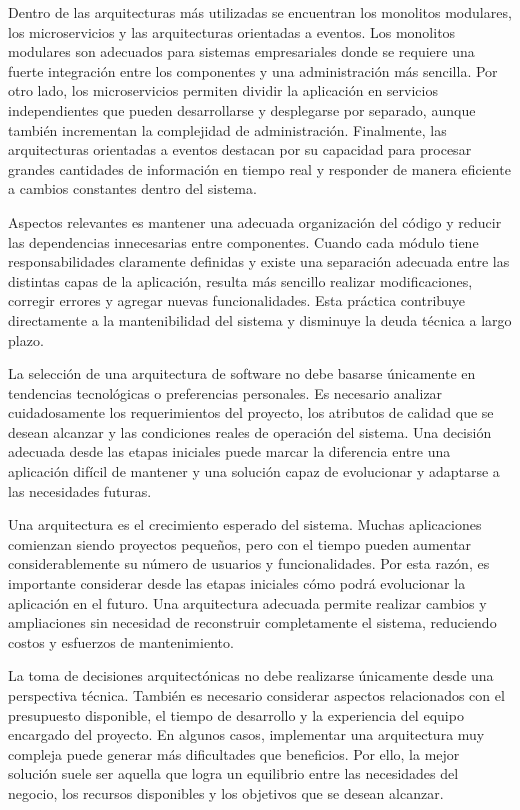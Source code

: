 \documentclass[12pt,letterpaper]{article}
\begin{document}
Dentro de las arquitecturas más utilizadas se encuentran los monolitos modulares, los microservicios y las arquitecturas orientadas a eventos. Los monolitos modulares son adecuados para sistemas empresariales donde se requiere una fuerte integración entre los componentes y una administración más sencilla. Por otro lado, los microservicios permiten dividir la aplicación en servicios independientes que pueden desarrollarse y desplegarse por separado, aunque también incrementan la complejidad de administración. Finalmente, las arquitecturas orientadas a eventos destacan por su capacidad para procesar grandes cantidades de información en tiempo real y responder de manera eficiente a cambios constantes dentro del sistema.

Aspectos relevantes es mantener una adecuada organización del código y reducir las dependencias innecesarias entre componentes. Cuando cada módulo tiene responsabilidades claramente definidas y existe una separación adecuada entre las distintas capas de la aplicación, resulta más sencillo realizar modificaciones, corregir errores y agregar nuevas funcionalidades. Esta práctica contribuye directamente a la mantenibilidad del sistema y disminuye la deuda técnica a largo plazo.

La selección de una arquitectura de software no debe basarse únicamente en tendencias tecnológicas o preferencias personales. Es necesario analizar cuidadosamente los requerimientos del proyecto, los atributos de calidad que se desean alcanzar y las condiciones reales de operación del sistema. Una decisión adecuada desde las etapas iniciales puede marcar la diferencia entre una aplicación difícil de mantener y una solución capaz de evolucionar y adaptarse a las necesidades futuras.

Una arquitectura es el crecimiento esperado del sistema. Muchas aplicaciones comienzan siendo proyectos pequeños, pero con el tiempo pueden aumentar considerablemente su número de usuarios y funcionalidades. Por esta razón, es importante considerar desde las etapas iniciales cómo podrá evolucionar la aplicación en el futuro. Una arquitectura adecuada permite realizar cambios y ampliaciones sin necesidad de reconstruir completamente el sistema, reduciendo costos y esfuerzos de mantenimiento.

La toma de decisiones arquitectónicas no debe realizarse únicamente desde una perspectiva técnica. También es necesario considerar aspectos relacionados con el presupuesto disponible, el tiempo de desarrollo y la experiencia del equipo encargado del proyecto. En algunos casos, implementar una arquitectura muy compleja puede generar más dificultades que beneficios. Por ello, la mejor solución suele ser aquella que logra un equilibrio entre las necesidades del negocio, los recursos disponibles y los objetivos que se desean alcanzar.
\end{document}
